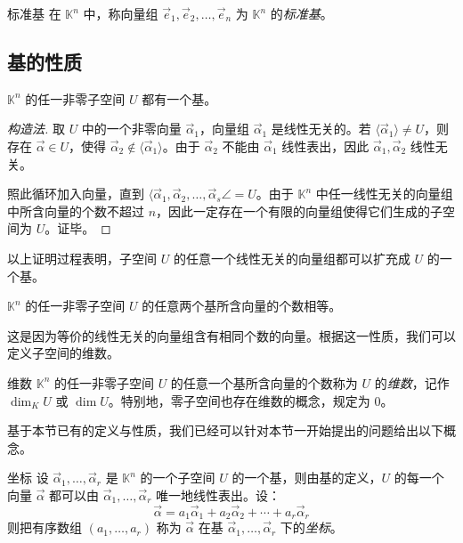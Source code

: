 \begin{definition}{标准基}
	在 $\mathbb K^n$ 中，称向量组 $\vec e_1, \vec e_2, \ldots, \vec e_n$ 为 $\mathbb K^n$ 的\emph{标准基}。
\end{definition}

\subsection{基的性质}

\begin{theorem}
	$\mathbb K^n$ 的任一非零子空间 $U$ 都有一个基。
\end{theorem}

\begin{proof}[构造法]
	取 $U$ 中的一个非零向量 $\vec \alpha_1$，向量组 $\vec \alpha_1$ 是线性无关的。若 $\langle \vec \alpha_1 \rangle \ne U$，则存在 $\vec \alpha \in U$，使得 $\vec \alpha_2 \not \in \langle \vec \alpha_1 \rangle$。由于 $\vec \alpha_2$ 不能由 $\vec \alpha_1$ 线性表出，因此 $\vec \alpha_1, \vec \alpha_2$ 线性无关。

	照此循环加入向量，直到 $\langle \vec \alpha_1, \vec \alpha_2, \ldots, \vec \alpha_s \angle = U$。由于 $\mathbb K^n$ 中任一线性无关的向量组中所含向量的个数不超过 $n$，因此一定存在一个有限的向量组使得它们生成的子空间为 $U$。证毕。
\end{proof}

以上证明过程表明，子空间 $U$ 的任意一个线性无关的向量组都可以扩充成 $U$ 的一个基。

\begin{theorem}
	$\mathbb K^n$ 的任一非零子空间 $U$ 的任意两个基所含向量的个数相等。
\end{theorem}

这是因为等价的线性无关的向量组含有相同个数的向量。根据这一性质，我们可以定义子空间的维数。

\begin{definition}{维数}
	$\mathbb K^n$ 的任一非零子空间 $U$ 的任意一个基所含向量的个数称为 $U$ 的\emph{维数}，记作 $\dim_K U$ 或 $\dim U$。特别地，零子空间也存在维数的概念，规定为 $0$。
\end{definition}

基于本节已有的定义与性质，我们已经可以针对本节一开始提出的问题给出以下概念。

\begin{definition}{坐标}
	设 $\vec \alpha_1, \ldots, \vec \alpha_r$ 是 $\mathbb K^n$ 的一个子空间 $U$ 的一个基，则由基的定义，$U$ 的每一个向量 $\vec \alpha$ 都可以由 $\vec \alpha_1, \ldots, \vec \alpha_r$ 唯一地线性表出。设：
	$$
	\vec \alpha = a_1 \vec \alpha_1 + a_2 \vec \alpha_2 + \cdots + a_r \vec \alpha_r
	$$
	则把有序数组 $(a_1, \ldots, a_r)$ 称为 $\vec \alpha$ 在基 $\vec \alpha_1, \ldots, \vec \alpha_r$ 下的\emph{坐标}。
\end{definition}

